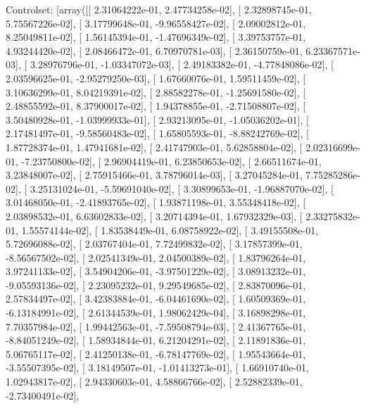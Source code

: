 \documentclass{article}
\begin{document}
Controlset: [array([[  2.31064222e-01,   2.47734258e-02],
       [  2.32898745e-01,   5.75567226e-02],
       [  3.17799648e-01,  -9.96558427e-02],
       [  2.09002812e-01,   8.25049811e-02],
       [  1.56145394e-01,  -1.47696349e-02],
       [  3.39753757e-01,   4.93244420e-02],
       [  2.08466472e-01,   6.70970781e-03],
       [  2.36150759e-01,   6.23367571e-03],
       [  3.28976796e-01,  -1.03347072e-03],
       [  2.49183382e-01,  -4.77848086e-02],
       [  2.03596625e-01,  -2.95279250e-03],
       [  1.67660076e-01,   1.59511459e-02],
       [  3.10636299e-01,   8.04219391e-02],
       [  2.88582278e-01,  -1.25691580e-02],
       [  2.48855592e-01,   8.37900017e-02],
       [  1.94378855e-01,  -2.71508807e-02],
       [  3.50480928e-01,  -1.03999933e-01],
       [  2.93213095e-01,  -1.05036202e-01],
       [  2.17481497e-01,  -9.58560483e-02],
       [  1.65805593e-01,  -8.88242769e-02],
       [  1.87728374e-01,   1.47941681e-02],
       [  2.41747903e-01,   5.62858804e-02],
       [  2.02316699e-01,  -7.23750800e-02],
       [  2.96904419e-01,   6.23850653e-02],
       [  2.66511674e-01,   3.23848007e-02],
       [  2.75915466e-01,   3.78796014e-03],
       [  3.27045284e-01,   7.75285286e-02],
       [  3.25131024e-01,  -5.59691040e-02],
       [  3.30899653e-01,  -1.96887070e-02],
       [  3.01468050e-01,  -2.41893765e-02],
       [  1.93871198e-01,   3.55348418e-02],
       [  2.03898532e-01,   6.63602833e-02],
       [  3.20714394e-01,   1.67932329e-03],
       [  2.33275832e-01,   1.55574144e-02],
       [  1.83538449e-01,   6.08758922e-02],
       [  3.49155508e-01,   5.72696088e-02],
       [  2.03767404e-01,   7.72499832e-02],
       [  3.17857399e-01,  -8.56567502e-02],
       [  2.02541349e-01,   2.04500389e-02],
       [  1.83796264e-01,   3.97241133e-02],
       [  3.54904206e-01,  -3.97501229e-02],
       [  3.08913232e-01,  -9.05593136e-02],
       [  2.23095232e-01,   9.29549685e-02],
       [  2.83870096e-01,   2.57834497e-02],
       [  3.42383884e-01,  -6.04461690e-02],
       [  1.60509369e-01,  -6.13184991e-02],
       [  2.61344539e-01,   1.98062429e-04],
       [  3.16898298e-01,   7.70357984e-02],
       [  1.99442563e-01,  -7.59508794e-03],
       [  2.41367765e-01,  -8.84051249e-02],
       [  1.58934844e-01,   6.21204291e-02],
       [  2.11891836e-01,   5.06765117e-02],
       [  2.41250138e-01,  -6.78147769e-02],
       [  1.95543664e-01,  -3.55507395e-02],
       [  3.18149507e-01,  -1.01413273e-01],
       [  1.66910740e-01,   1.02943817e-02],
       [  2.94330603e-01,   4.58866766e-02],
       [  2.52882339e-01,  -2.73400491e-02],
\end{document}
